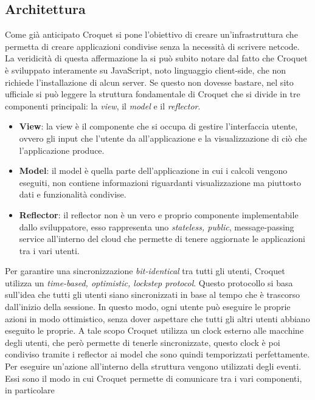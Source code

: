 \subsection{Architettura}\label{subsec:Croquet_architettura}
Come già anticipato Croquet si pone l'obiettivo di creare un'infrastruttura che permetta di creare applicazioni condivise senza la necessità di scrivere netcode. La veridicità di
questa affermazione la si può subito notare dal fatto che Croquet è sviluppato interamente su JavaScript, noto linguaggio client-side, che non richiede l'installazione di alcun server. 
Se questo non dovesse bastare, nel sito ufficiale si può leggere la struttura fondamentale di Croquet che si divide in tre componenti principali: la \textit{view}, il \textit{model}
e il \textit{reflector}.
\begin{itemize}
    \item \textbf{View}: la view è il componente che si occupa di gestire l'interfaccia utente, ovvero gli input che l'utente da all'applicazione e la visualizzazione di ciò che
    l'applicazione produce. 
    \item \textbf{Model}: il model è quella parte dell'applicazione in cui i calcoli vengono eseguiti, non contiene informazioni riguardanti visualizzazione ma piuttosto dati e 
    funzionalità condivise.
    \item \textbf{Reflector}: il reflector non è un vero e proprio componente implementabile dallo sviluppatore, esso rappresenta uno \textit{stateless, public}, message-passing service
    all'interno del cloud che permette di tenere aggiornate le applicazioni tra i vari utenti.
\end{itemize}
Per garantire una sincronizzazione \textit{bit-identical} tra tutti gli utenti, Croquet utilizza un \textit{time-based, optimistic, lockstep protocol}. Questo protocollo si basa
sull'idea che tutti gli utenti siano sincronizzati in base al tempo che è trascorso dall'inizio della sessione. In questo modo, ogni utente può eseguire le proprie azioni in modo
ottimistico, senza dover aspettare che tutti gli altri utenti abbiano eseguito le proprie. A tale scopo Croquet utilizza un clock esterno alle macchine degli utenti, che però
permette di tenerle sincronizzate, questo clock è poi condiviso tramite i reflector ai model che sono quindi temporizzati perfettamente.\\
\newline
Per eseguire un'azione all'interno della struttura vengono utilizzati degli eventi. Essi sono il modo in cui Croquet permette di comunicare tra i vari componenti, in particolare
